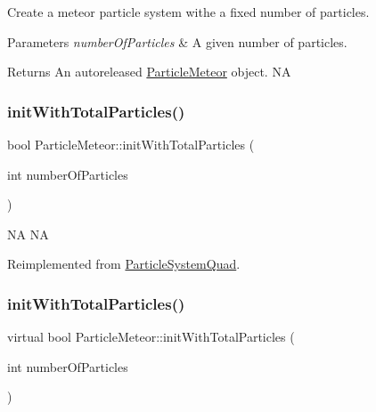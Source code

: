 Create a meteor particle system withe a fixed number of particles.


\begin{DoxyParams}{Parameters}
{\em number\+Of\+Particles} & A given number of particles. \\
\hline
\end{DoxyParams}
\begin{DoxyReturn}{Returns}
An autoreleased \hyperlink{classParticleMeteor}{Particle\+Meteor} object.  NA 
\end{DoxyReturn}
\mbox{\label{classParticleMeteor_afdcabc1ed84b2161135a2854850a0143}} 
\subsubsection{\texorpdfstring{init\+With\+Total\+Particles()}{initWithTotalParticles()}\hspace{0.1cm}{\footnotesize\ttfamily [1/2]}}
{\footnotesize\ttfamily bool Particle\+Meteor\+::init\+With\+Total\+Particles (\begin{DoxyParamCaption}\item[{int}]{number\+Of\+Particles }\end{DoxyParamCaption})\hspace{0.3cm}{\ttfamily [virtual]}}

NA  NA 

Reimplemented from \hyperlink{classParticleSystemQuad_ae5420007b57e909c05e7476a54fbfbe9}{Particle\+System\+Quad}.

\mbox{\label{classParticleMeteor_a4150cf7ece1830194a02a9ab45abde41}} 
\subsubsection{\texorpdfstring{init\+With\+Total\+Particles()}{initWithTotalParticles()}\hspace{0.1cm}{\footnotesize\ttfamily [2/2]}}
{\footnotesize\ttfamily virtual bool Particle\+Meteor\+::init\+With\+Total\+Particles (\begin{DoxyParamCaption}\item[{int}]{number\+Of\+Particles }\end{DoxyParamCaption})\hspace{0.3cm}{\ttfamily [virtual]}}

